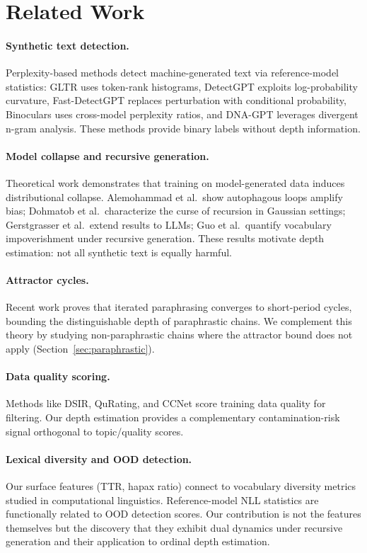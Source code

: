 \documentclass[letterpaper]{article}
\begin{document}
\section{Related Work}
\label{sec:related}

\paragraph{Synthetic text detection.}
Perplexity-based methods detect machine-generated text via reference-model statistics: GLTR uses token-rank histograms, DetectGPT exploits log-probability curvature, Fast-DetectGPT replaces perturbation with conditional probability, Binoculars uses cross-model perplexity ratios, and DNA-GPT leverages divergent n-gram analysis.
These methods provide binary labels without depth information.

\paragraph{Model collapse and recursive generation.}
Theoretical work demonstrates that training on model-generated data induces distributional collapse.
Alemohammad et al.\ show autophagous loops amplify bias; Dohmatob et al.\ characterize the curse of recursion in Gaussian settings; Gerstgrasser et al.\ extend results to LLMs; Guo et al.\ quantify vocabulary impoverishment under recursive generation.
These results motivate depth estimation: not all synthetic text is equally harmful.

\paragraph{Attractor cycles.}
Recent work proves that iterated paraphrasing converges to short-period cycles, bounding the distinguishable depth of paraphrastic chains.
We complement this theory by studying non-paraphrastic chains where the attractor bound does not apply (Section~\ref{sec:paraphrastic}).

\paragraph{Data quality scoring.}
Methods like DSIR, QuRating, and CCNet score training data quality for filtering.
Our depth estimation provides a complementary contamination-risk signal orthogonal to topic/quality scores.

\paragraph{Lexical diversity and OOD detection.}
Our surface features (TTR, hapax ratio) connect to vocabulary diversity metrics studied in computational linguistics.
Reference-model NLL statistics are functionally related to OOD detection scores.
Our contribution is not the features themselves but the discovery that they exhibit dual dynamics under recursive generation and their application to ordinal depth estimation.
\end{document}
